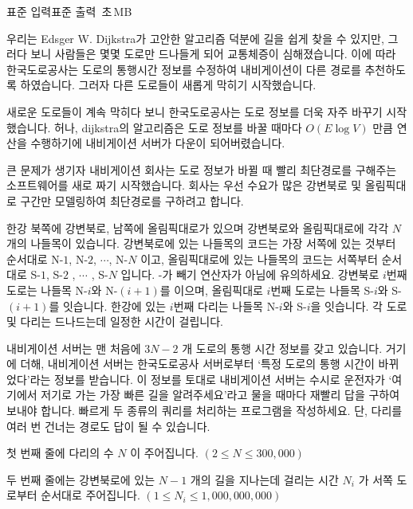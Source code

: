 \begin{problem}{\kcpcnavigationtitle}
    {표준 입력}{표준 출력}
    {\kcpcnavigationtime\,초}{\kcpcnavigationmemory\,MB}{}{\kcpcnavigationscore}
    
    우리는 Edsger W. Dijkstra가 고안한 알고리즘 덕분에 길을 쉽게 찾을 수 있지만, 그러다 보니 사람들은 몇몇 도로만 드나들게 되어 교통체증이 심해졌습니다. 이에 따라 한국도로공사는 도로의 통행시간 정보를 수정하여 내비게이션이 다른 경로를 추천하도록 하였습니다. 그러자 다른 도로들이 새롭게 막히기 시작했습니다.
    
    새로운 도로들이 계속 막히다 보니 한국도로공사는 도로 정보를 더욱 자주 바꾸기 시작했습니다. 허나, dijkstra의 알고리즘은 도로 정보를 바꿀 때마다 $ O(E \log V) $ 만큼 연산을 수행하기에 내비게이션 서버가 다운이 되어버렸습니다.
    
    큰 문제가 생기자 내비게이션 회사는 도로 정보가 바뀔 때 빨리 최단경로를 구해주는 소프트웨어를 새로 짜기 시작했습니다. 회사는 우선 수요가 많은 강변북로 및 올림픽대로 구간만 모델링하여 최단경로를 구하려고 합니다.
    
    한강 북쪽에 강변북로, 남쪽에 올림픽대로가 있으며 강변북로와 올림픽대로에 각각 $ N $개의 나들목이 있습니다. 강변북로에 있는 나들목의 코드는 가장 서쪽에 있는 것부터 순서대로 N-$ 1 $, N-$ 2 $, $ \cdots  $, N-$ N $ 이고, 올림픽대로에 있는 나들목의 코드는 서쪽부터 순서대로 S-$ 1 $, S-$ 2 $ , $ \cdots $ , S-$ N $ 입니다. -가 빼기 연산자가 아님에 유의하세요. 강변북로 $ i $번째 도로는 나들목 N-$ i $와 N-$ (i+1) $를 이으며, 올림픽대로 $ i $번째 도로는 나들목 S-$ i $와 S-$ (i+1) $를 잇습니다. 한강에 있는 $ i $번째 다리는 나들목 N-$ i $와 S-$ i $을 잇습니다. 각 도로 및 다리는 드나드는데 일정한 시간이 걸립니다.
    
    내비게이션 서버는 맨 처음에 $ 3N-2 $ 개 도로의 통행 시간 정보를 갖고 있습니다. 거기에 더해, 내비게이션 서버는 한국도로공사 서버로부터 `특정 도로의 통행 시간이 바뀌었다'라는 정보를 받습니다. 이 정보를 토대로 내비게이션 서버는 수시로 운전자가 `여기에서 저기로 가는 가장 빠른 길을 알려주세요'라고 물을 때마다 재빨리 답을 구하여 보내야 합니다. 빠르게 두 종류의 쿼리를 처리하는 프로그램을 작성하세요. 단, 다리를 여러 번 건너는 경로도 답이 될 수 있습니다.
    
    \InputFile
    첫 번째 줄에 다리의 수 $ N $ 이 주어집니다. $ (2 \leq N \leq 300,000) $
    
    두 번째 줄에는 강변북로에 있는 $ N-1 $ 개의 길을 지나는데 걸리는 시간 $ N_i $ 가 서쪽 도로부터 순서대로 주어집니다. $ (1 \leq N_i \leq 1,000,000,000) $
    

\end{problem}
